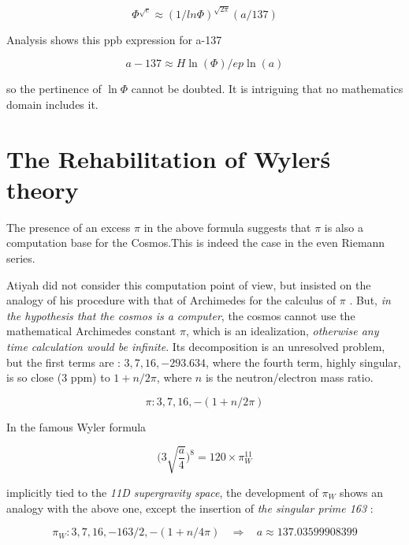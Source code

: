 \documentclass[a4paper,9pt]{article}
\begin{document}
\begin{equation}
    \Phi^{\sqrt e} \approx (1/ln\Phi)^{\sqrt {2\pi}} (a/137)
\end{equation}

Analysis shows this ppb expression for a-137

\begin{equation}
   a - 137 \approx H \ln(\Phi) /ep\ln(a)
\end{equation}

so the pertinence of $\ln\Phi$ cannot be doubted. It is intriguing that no mathematics domain includes it.







\section{The Rehabilitation of Wyler\'s theory}
The presence of an excess $\pi$ in the above formula suggests that $\pi$ is also a computation base for the Cosmos.This is indeed the case in the even Riemann series.


Atiyah did not consider this computation point of view, but insisted on the analogy of his procedure with that of Archimedes for the calculus of $\pi$ \cite{Atiyah}. But, \textit {in the hypothesis that the cosmos is a computer}, the cosmos cannot use the mathematical Archimedes constant $\pi$, which is an idealization, \textit {otherwise any time calculation would be infinite}. Its decomposition is an unresolved problem, but the first terms are : $3, 7, 16, -293.634$, where the fourth term, highly singular, is so close (3 ppm) to $1 + n/2\pi$, where $n$ is the neutron/electron mass ratio.

\begin{equation}
\pi : 3, 7, 16, -(1+n/2\pi)
\end{equation}


In the famous Wyler formula \cite{Wyler} 

\begin{equation}
\big(3\sqrt{\frac{a}{4}} \big)^8 = 120 \times \pi_W^{11}
\end{equation}


implicitly tied to the \emph{11D supergravity space}, the development of  $\pi_W$ shows an analogy with the above one, except the insertion of \textit {the singular prime 163} :

\begin{equation}
\pi_W : 3, 7, 16,- 163/2, -(1+n/4\pi) ~~~~\Rightarrow ~~~~    a \approx 137.03599908399
\end{equation}
\end{document}
